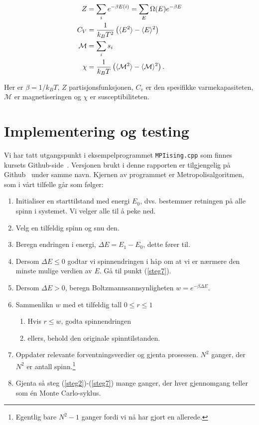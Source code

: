 \documentclass[11pt]{article}
\begin{document}
\begin{align}
Z &= \sum_i e^{-\beta E(i)} = \sum_E \Omega(E) e^{-\beta E}\label{eq:partisjons-funk} \\
C_V &= \frac{ 1 }{ k_B T^2} \left( \langle E^2 \rangle-\langle E \rangle^2 \right)\label{eq:spesifikk-varmekapasitet} \\
\mathcal{M} &= \sum_i s_i\label{eq:magnetisering} \\
\chi &= \frac{ 1 }{ k_BT } \left( \langle \mathcal{M}^2 \rangle - \langle \mathcal{M} \rangle^2 \right)\label{eq:susceptibilitet}.
\end{align}

Her er $\beta = 1/k_BT$, $Z$ partisjonsfunksjonen, $C_v$ er den spesifikke varmekapasiteten,
$\mathcal{M}$ er magnetiseringen og $\chi$ er susceptibiliteten. 

\section{Implementering og testing}

Vi har tatt utgangspunkt i eksempelprogrammet \texttt{MPIising.cpp}
som finnes kursets Github-side~\cite{compphys-github}. Versjonen brukt
i denne rapporten er tilgjengelig på Github~\cite{github-repo} under samme navn. Kjernen av
programmet er Metropolisalgoritmen, som i vårt tilfelle går som følger: 

\begin{enumerate}
\item Initialiser en starttilstand med energi $E_0$, dvs. bestemmer retningen på
  alle spinn i systemet. Vi velger alle til å peke ned.
\item Velg en tilfeldig spinn og snu den.\label{steg2}
\item Beregn endringen i energi, $\Delta E = E_1-E_0$, dette fører til.\label{steg3} 
\item Dersom $\Delta E \leq 0$ godtar vi spinnendringen i håp om at vi
  er nærmere den minste mulige verdien av $E$. Gå til punkt (\ref{steg7}).
\item Dersom $\Delta E > 0 $, beregn Boltzmannsannsynligheten $w =
  e^{-\beta\Delta E}$. 
\item Sammenlikn $w$ med et tilfeldig tall $0\leq r\leq 1$
\begin{enumerate}
  \item Hvis $r\leq w$, godta spinnendringen
  \item ellers, behold den originale spinntilstanden.
\end{enumerate}
\item Oppdater relevante forventningsverdier og gjenta prosessen.\label{steg7}
  $N^2$ ganger, der $N^2$ er antall spinn.\footnote{Egentlig bare $N^2-1$ ganger fordi vi nå har gjort en
  allerede.}
\item Gjenta så steg (\ref{steg2})-(\ref{steg7}) mange ganger, der hver gjennomgang teller som
  én Monte Carlo-syklus.
\end{enumerate}
\end{document}
